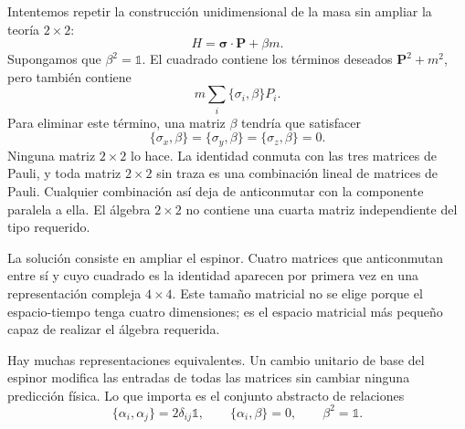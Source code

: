 Intentemos repetir la construcción unidimensional de la masa sin ampliar la teoría \(2\times2\):
\begin{equation}
H=\boldsymbol{\sigma}\cdot\mathbf P+\beta m.
\label{eq:l10-failed-mass}
\end{equation}
Supongamos que \(\beta^2=\mathbb{1}\). El cuadrado contiene los términos deseados \(\mathbf P^2+m^2\), pero también contiene
\begin{equation}
m\sum_i\{\sigma_i,\beta\}P_i.
\end{equation}
Para eliminar este término, una matriz \(\beta\) tendría que satisfacer
\begin{equation}
\{\sigma_x,\beta\}
=
\{\sigma_y,\beta\}
=
\{\sigma_z,\beta\}
=0.
\label{eq:l10-impossible-beta}
\end{equation}
Ninguna matriz \(2\times2\) lo hace. La identidad conmuta con las tres matrices de Pauli, y toda matriz \(2\times2\) sin traza es una combinación lineal de matrices de Pauli. Cualquier combinación así deja de anticonmutar con la componente paralela a ella. El álgebra \(2\times2\) no contiene una cuarta matriz independiente del tipo requerido.

La solución consiste en ampliar el espinor. Cuatro matrices que anticonmutan entre sí y cuyo cuadrado es la identidad aparecen por primera vez en una representación compleja \(4\times4\). Este tamaño matricial no se elige porque el espacio-tiempo tenga cuatro dimensiones; es el espacio matricial más pequeño capaz de realizar el álgebra requerida.

Hay muchas representaciones equivalentes. Un cambio unitario de base del espinor modifica las entradas de todas las matrices sin cambiar ninguna predicción física. Lo que importa es el conjunto abstracto de relaciones
\begin{equation}
\{\alpha_i,\alpha_j\}=2\delta_{ij}\mathbb{1},
\qquad
\{\alpha_i,\beta\}=0,
\qquad
\beta^2=\mathbb{1}.
\label{eq:l10-dirac-algebra}
\end{equation}

\begin{classroomqa}
\end{classroomqa}

